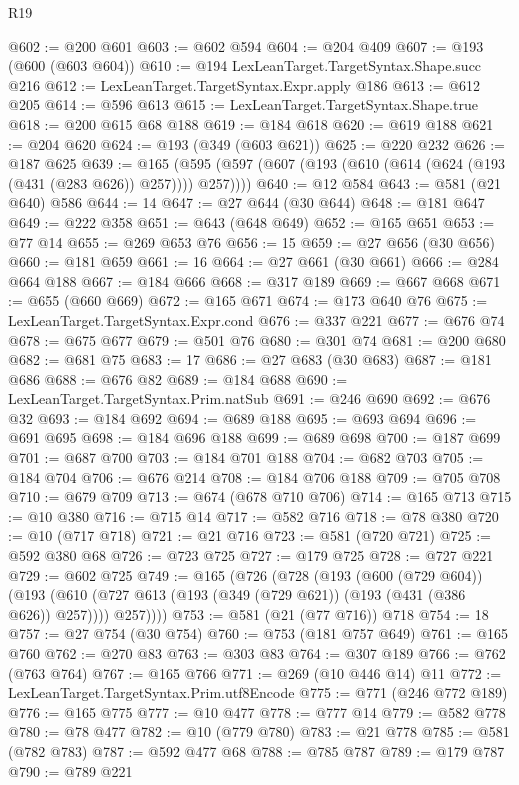 \begin{lexlean}{R19}
\begin{coremodule}
@602 := @200 @601
@603 := @602 @594
@604 := @204 @409
@607 := @193 (@600 (@603 @604))
@610 := @194 LexLeanTarget.TargetSyntax.Shape.succ @216
@612 := LexLeanTarget.TargetSyntax.Expr.apply @186
@613 := @612 @205
@614 := @596 @613
@615 := LexLeanTarget.TargetSyntax.Shape.true
@618 := @200 @615 @68 @188
@619 := @184 @618
@620 := @619 @188
@621 := @204 @620
@624 := @193 (@349 (@603 @621))
@625 := @220 @232
@626 := @187 @625
@639 := @165 (@595 (@597 (@607 (@193 (@610 (@614 (@624 (@193 (@431 (@283 @626)) @257)))) @257))))
@640 := @12 @584
@643 := @581 (@21 @640) @586
@644 := 14
@647 := @27 @644 (@30 @644)
@648 := @181 @647
@649 := @222 @358
@651 := @643 (@648 @649)
@652 := @165 @651
@653 := @77 @14
@655 := @269 @653 @76
@656 := 15
@659 := @27 @656 (@30 @656)
@660 := @181 @659
@661 := 16
@664 := @27 @661 (@30 @661)
@666 := @284 @664 @188
@667 := @184 @666
@668 := @317 @189
@669 := @667 @668
@671 := @655 (@660 @669)
@672 := @165 @671
@674 := @173 @640 @76
@675 := LexLeanTarget.TargetSyntax.Expr.cond
@676 := @337 @221
@677 := @676 @74
@678 := @675 @677
@679 := @501 @76
@680 := @301 @74
@681 := @200 @680
@682 := @681 @75
@683 := 17
@686 := @27 @683 (@30 @683)
@687 := @181 @686
@688 := @676 @82
@689 := @184 @688
@690 := LexLeanTarget.TargetSyntax.Prim.natSub
@691 := @246 @690
@692 := @676 @32
@693 := @184 @692
@694 := @689 @188
@695 := @693 @694
@696 := @691 @695
@698 := @184 @696 @188
@699 := @689 @698
@700 := @187 @699
@701 := @687 @700
@703 := @184 @701 @188
@704 := @682 @703
@705 := @184 @704
@706 := @676 @214
@708 := @184 @706 @188
@709 := @705 @708
@710 := @679 @709
@713 := @674 (@678 @710 @706)
@714 := @165 @713
@715 := @10 @380
@716 := @715 @14
@717 := @582 @716
@718 := @78 @380
@720 := @10 (@717 @718)
@721 := @21 @716
@723 := @581 (@720 @721)
@725 := @592 @380 @68
@726 := @723 @725
@727 := @179 @725
@728 := @727 @221
@729 := @602 @725
@749 := @165
    (@726
      (@728
        (@193
          (@600 (@729 @604))
          (@193 (@610 (@727 @613 (@193 (@349 (@729 @621)) (@193 (@431 (@386 @626)) @257)))) @257))))
@753 := @581 (@21 (@77 @716)) @718
@754 := 18
@757 := @27 @754 (@30 @754)
@760 := @753 (@181 @757 @649)
@761 := @165 @760
@762 := @270 @83
@763 := @303 @83
@764 := @307 @189
@766 := @762 (@763 @764)
@767 := @165 @766
@771 := @269 (@10 @446 @14) @11
@772 := LexLeanTarget.TargetSyntax.Prim.utf8Encode
@775 := @771 (@246 @772 @189)
@776 := @165 @775
@777 := @10 @477
@778 := @777 @14
@779 := @582 @778
@780 := @78 @477
@782 := @10 (@779 @780)
@783 := @21 @778
@785 := @581 (@782 @783)
@787 := @592 @477 @68
@788 := @785 @787
@789 := @179 @787
@790 := @789 @221

\end{coremodule}
\end{lexlean}
